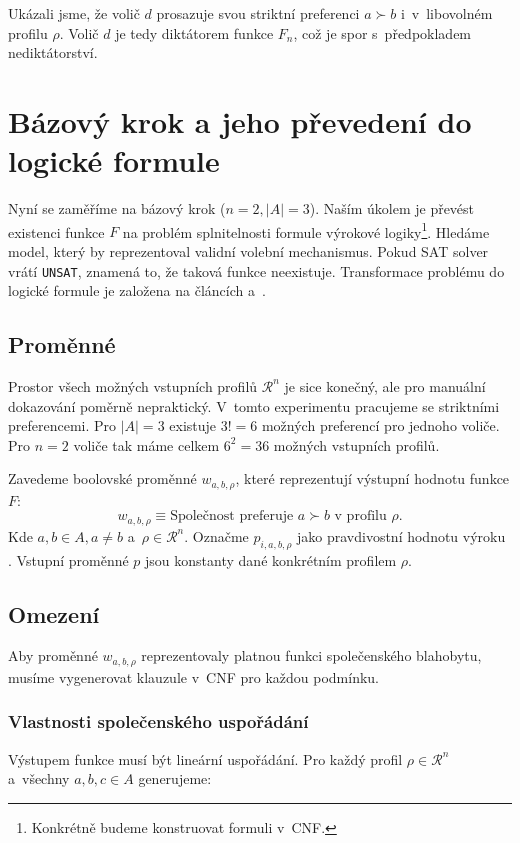 \documentclass[a4paper, 11pt]{article}
\begin{document}
Ukázali jsme, že volič $d$ prosazuje svou striktní preferenci $a \succ b$ i~v~libovolném profilu $\rho$.
Volič $d$ je tedy diktátorem funkce $F_n$, což je spor s~předpokladem nediktátorství.

\section{Bázový krok a jeho převedení do logické formule}\label{sec:Encoding}

Nyní se zaměříme na bázový krok ($n=2, |A|=3$). Naším úkolem je převést existenci funkce $F$ na problém splnitelnosti formule výrokové logiky\footnote{Konkrétně budeme konstruovat formuli v~CNF.}.
Hledáme model, který by reprezentoval validní volební mechanismus.
Pokud SAT solver vrátí \texttt{UNSAT}, znamená to, že taková funkce neexistuje.
Transformace problému do logické formule je založena na článcích \cite{brandt2016finding} a~\cite{geist2011automated}.

\subsection{Proměnné}

Prostor všech možných vstupních profilů $\mathcal{R}^n$ je sice konečný, ale pro manuální dokazování poměrně nepraktický.
V~tomto experimentu pracujeme se striktními preferencemi.
Pro $|A|=3$ existuje $3! = 6$ možných preferencí pro jednoho voliče.
Pro $n=2$ voliče tak máme celkem $6^2 = 36$ možných vstupních profilů.

Zavedeme boolovské proměnné $w_{a, b, \rho}$, které reprezentují výstupní hodnotu funkce $F$:
\[
    w_{a, b, \rho} \equiv \text{Společnost preferuje } a \succ b \text{ v profilu } \rho.
\]
Kde $a, b \in A, a \neq b$ a~$\rho \in \mathcal{R}^n$.
Označme $p_{i, a, b, \rho}$ jako pravdivostní hodnotu výroku .
Vstupní proměnné $p$ jsou konstanty dané konkrétním profilem $\rho$.

\subsection{Omezení}

Aby proměnné $w_{a, b, \rho}$ reprezentovaly platnou funkci společenského blahobytu, musíme vygenerovat klauzule v~CNF pro každou podmínku.

\subsubsection{Vlastnosti společenského uspořádání}
Výstupem funkce musí být lineární uspořádání. Pro každý profil $\rho \in \mathcal{R}^n$ a~všechny $a, b, c \in A$ generujeme:
\end{document}
